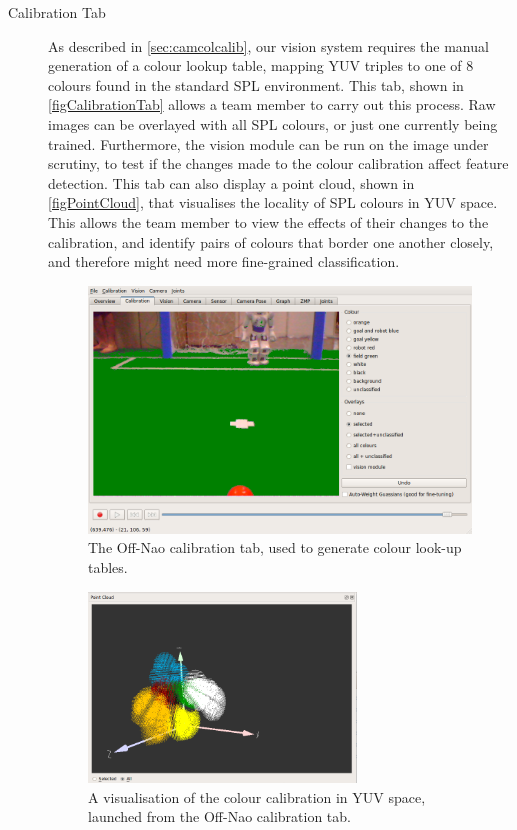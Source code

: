 \documentclass[pdftex,11pt,a4paper]{report}
\begin{document}
\begin{description}
\item[Calibration Tab]
As described in \autoref{sec:camcolcalib}, our vision system requires the manual generation of a colour lookup table, mapping YUV triples to one of 8 colours found in the standard SPL environment. This tab, shown in \autoref{figCalibrationTab} allows a team member to carry out this process. Raw images can be overlayed with all SPL colours, or just one currently being trained. Furthermore, the vision module can be run on the image under scrutiny, to test if the changes made to the colour calibration affect feature detection. This tab can also display a point cloud, shown in \autoref{figPointCloud}, that visualises the locality of SPL colours in YUV space. This allows the team member to view the effects of their changes to the calibration, and identify pairs of colours that border one another closely, and therefore might need more fine-grained classification.

\begin{figure}[ht]
\centering
\includegraphics[width=1.0\textwidth]{figures/calibrationTab}
\caption{The Off-Nao calibration tab, used to generate colour look-up tables.} \label{figCalibrationTab}
\end{figure}

\begin{figure}[ht]
\centering
\centering
\includegraphics[width=0.7\textwidth]{figures/pointCloud}
\caption{A visualisation of the colour calibration in YUV space, launched from the Off-Nao calibration tab.} \label{figPointCloud}
\end{figure}


\end{description}
\end{document}
